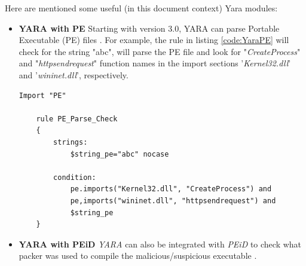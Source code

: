 \documentclass[pdfa%
,cucitura%
]{toptesi}
\begin{document}
Here are mentioned some useful (in this document context) Yara modules:
\begin{itemize}
	\item \textbf{YARA with PE}
	Starting with version 3.0, YARA can parse Portable Executable (PE) files \cite{NinjaYSEWDM}. For example, the rule in listing \ref{code:YaraPE} will check for the string "abc", will parse the PE file and look for "\textit{CreateProcess}" and "\textit{httpsendrequest}" function names in the import sections '\textit{Kernel32.dll}' and '\textit{wininet.dll}', respectively.
	
	\begin{lstlisting}[caption={YARA with PE}, label=code:YaraPE, language=YARA, style=mystyle]
	Import "PE"
	
	rule PE_Parse_Check
	{
		strings:
			$string_pe="abc" nocase

		condition:
			pe.imports("Kernel32.dll", "CreateProcess") and
			pe,imports("wininet.dll", "httpsendrequest") and
			$string_pe
	}
	\end{lstlisting}
	
	\item \textbf{YARA with PEiD}
	\textit{YARA} can also be integrated with \textit{PEiD} to check what packer was used to compile the malicious/suspicious executable \cite{NinjaYSEWDM}.
\end{itemize}
\end{document}
